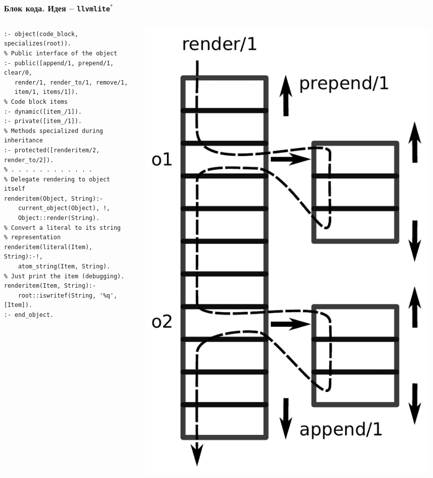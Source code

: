 \documentclass[handout]{beamer}
\begin{document}
\begin{frame}[fragile]
  \frametitle{Блок кода. Идея -- \texttt{llvmlite}${}^*$}
  \begin{columns}
    \begin{column}{0.6\textwidth}
      \flushleft
\begin{verbatim}
:- object(code_block, specializes(root)).
% Public interface of the object
:- public([append/1, prepend/1, clear/0,
   render/1, render_to/1, remove/1,
   item/1, items/1]).
% Code block items
:- dynamic([item_/1]).
:- private([item_/1]).
% Methods specialized during inheritance
:- protected([renderitem/2, render_to/2]).
% . . . . . . . . . . . .
% Delegate rendering to object itself
renderitem(Object, String):-
    current_object(Object), !,
    Object::render(String).
% Convert a literal to its string
% representation
renderitem(literal(Item), String):-!,
    atom_string(Item, String).
% Just print the item (debugging).
renderitem(Item, String):-
    root::iswritef(String, '%q', [Item]).
:- end_object.
\end{verbatim}
    \end{column}
    \begin{column}{0.4\textwidth}
      \includegraphics[width=1\linewidth]{code_block.pdf}

\end{column}
\end{columns}
\end{frame}
\end{document}
